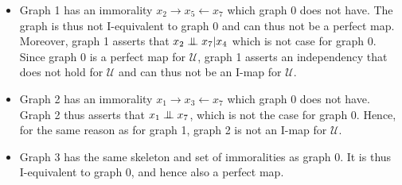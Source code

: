 \begin{exenumerate}
\begin{center}
\end{center}

\begin{solution}
  \begin{itemize}
    \item Graph 1 has an immorality $x_2 \rightarrow x_5
      \leftarrow x_7$ which graph 0 does not have. The graph is thus not I-equivalent to graph 0
      and can thus not be a perfect map. Moreover, graph 1 asserts
      that $x_2 \mathrel{\perp\mspace{-10mu}\perp} x_7 | x_4$ which is not case for graph
      0. Since graph 0 is a perfect map for $\mathcal{U}$, graph 1
      asserts an independency that does not hold for $\mathcal{U}$ and
      can thus not be an I-map for $\mathcal{U}.$
    \item Graph 2 has an immorality $x_1 \rightarrow x_3 \leftarrow x_7$ which graph 0 does not have. Graph 2 thus asserts that $x_1 \mathrel{\perp\mspace{-10mu}\perp} x_7$, which is not the case for graph 0. Hence, for the same reason as for graph 1, graph 2 is not an I-map for $\mathcal{U}$.
    \item Graph 3 has the same skeleton and set of immoralities as graph 0. It is thus I-equivalent to graph 0, and hence also a perfect map.
  \end{itemize}
\end{solution}


\end{exenumerate}


